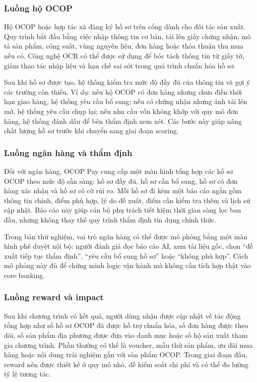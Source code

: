 \documentclass[13pt,a4paper]{extarticle}
\begin{document}
\subsubsection{Luồng hộ OCOP}

Hộ OCOP hoặc hợp tác xã đăng ký hồ sơ trên cổng dành cho đối tác sản xuất. Quy trình bắt đầu bằng việc nhập thông tin cơ bản, tải lên giấy chứng nhận, mô tả sản phẩm, công suất, vùng nguyên liệu, đơn hàng hoặc thỏa thuận thu mua nếu có. Công nghệ OCR có thể được sử dụng để bóc tách thông tin từ giấy tờ, giảm thao tác nhập liệu và hạn chế sai sót trong quá trình chuẩn hóa hồ sơ.

Sau khi hồ sơ được tạo, hệ thống kiểm tra mức độ đầy đủ của thông tin và gợi ý các trường còn thiếu. Ví dụ: nếu hộ OCOP có đơn hàng nhưng chưa điền thời hạn giao hàng, hệ thống yêu cầu bổ sung; nếu có chứng nhận nhưng ảnh tải lên mờ, hệ thống yêu cầu chụp lại; nếu nhu cầu vốn không khớp với quy mô đơn hàng, hệ thống đánh dấu để bên thẩm định xem xét. Các bước này giúp nâng chất lượng hồ sơ trước khi chuyển sang giai đoạn scoring.


\subsubsection{Luồng ngân hàng và thẩm định}

Đối với ngân hàng, OCOP Pay cung cấp một màn hình tổng hợp các hồ sơ OCOP theo mức độ sẵn sàng: hồ sơ đầy đủ, hồ sơ cần bổ sung, hồ sơ có đơn hàng xác nhận và hồ sơ có cờ rủi ro. Mỗi hồ sơ đi kèm một báo cáo ngắn gồm thông tin chính, điểm phù hợp, lý do đề xuất, điểm cần kiểm tra thêm và lịch sử cập nhật. Báo cáo này giúp cán bộ phụ trách tiết kiệm thời gian sàng lọc ban đầu, nhưng không thay thế quy trình thẩm định tín dụng chính thức.

Trong bản thử nghiệm, vai trò ngân hàng có thể được mô phỏng bằng một màn hình phê duyệt nội bộ: người đánh giá đọc báo cáo AI, xem tài liệu gốc, chọn “đề xuất tiếp tục thẩm định”, “yêu cầu bổ sung hồ sơ” hoặc “không phù hợp”. Cách mô phỏng này đủ để chứng minh logic vận hành mà không cần tích hợp thật vào core banking.


\subsubsection{Luồng reward và impact}

Sau khi chương trình có kết quả, người dùng nhận được cập nhật về tác động tổng hợp như số hồ sơ OCOP đã được hỗ trợ chuẩn hóa, số đơn hàng được theo dõi, số sản phẩm địa phương được đưa vào danh mục hoặc số hộ sản xuất tham gia chương trình. Phần thưởng có thể là voucher, mẫu thử sản phẩm, ưu đãi mua hàng hoặc nội dung trải nghiệm gắn với sản phẩm OCOP. Trong giai đoạn đầu, reward nên được thiết kế ở quy mô nhỏ, dễ kiểm soát chi phí và có thể đo lường tỷ lệ tương tác.
\end{document}
